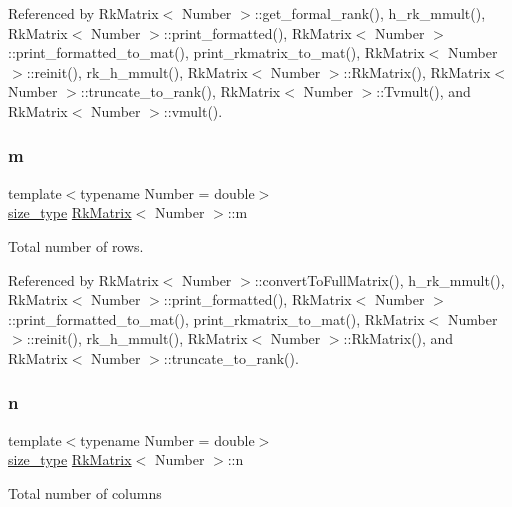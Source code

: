 Referenced by Rk\+Matrix$<$ Number $>$\+::get\+\_\+formal\+\_\+rank(), h\+\_\+rk\+\_\+mmult(), Rk\+Matrix$<$ Number $>$\+::print\+\_\+formatted(), Rk\+Matrix$<$ Number $>$\+::print\+\_\+formatted\+\_\+to\+\_\+mat(), print\+\_\+rkmatrix\+\_\+to\+\_\+mat(), Rk\+Matrix$<$ Number $>$\+::reinit(), rk\+\_\+h\+\_\+mmult(), Rk\+Matrix$<$ Number $>$\+::\+Rk\+Matrix(), Rk\+Matrix$<$ Number $>$\+::truncate\+\_\+to\+\_\+rank(), Rk\+Matrix$<$ Number $>$\+::\+Tvmult(), and Rk\+Matrix$<$ Number $>$\+::vmult().

\mbox{\label{classRkMatrix_a8ca8898bcfedeee135437833f83b144c}} 
\subsubsection{\texorpdfstring{m}{m}}
{\footnotesize\ttfamily template$<$typename Number = double$>$ \\
\hyperlink{classRkMatrix_add060bfc3a4cc77f858c3d6dd58cadd5}{size\+\_\+type} \hyperlink{classRkMatrix}{Rk\+Matrix}$<$ Number $>$\+::m\hspace{0.3cm}{\ttfamily [private]}}

Total number of rows. 

Referenced by Rk\+Matrix$<$ Number $>$\+::convert\+To\+Full\+Matrix(), h\+\_\+rk\+\_\+mmult(), Rk\+Matrix$<$ Number $>$\+::print\+\_\+formatted(), Rk\+Matrix$<$ Number $>$\+::print\+\_\+formatted\+\_\+to\+\_\+mat(), print\+\_\+rkmatrix\+\_\+to\+\_\+mat(), Rk\+Matrix$<$ Number $>$\+::reinit(), rk\+\_\+h\+\_\+mmult(), Rk\+Matrix$<$ Number $>$\+::\+Rk\+Matrix(), and Rk\+Matrix$<$ Number $>$\+::truncate\+\_\+to\+\_\+rank().

\mbox{\label{classRkMatrix_a06d3b6636bb423c391c66e4ccc722687}} 
\subsubsection{\texorpdfstring{n}{n}}
{\footnotesize\ttfamily template$<$typename Number = double$>$ \\
\hyperlink{classRkMatrix_add060bfc3a4cc77f858c3d6dd58cadd5}{size\+\_\+type} \hyperlink{classRkMatrix}{Rk\+Matrix}$<$ Number $>$\+::n\hspace{0.3cm}{\ttfamily [private]}}

Total number of columns 

